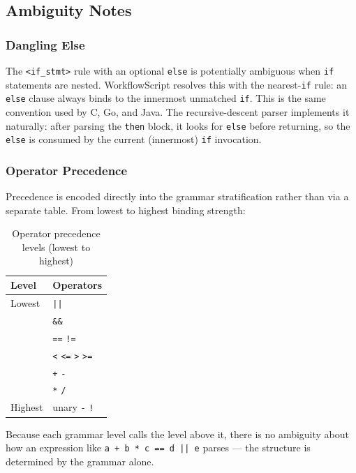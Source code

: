 \documentclass[10pt,a4paper]{article}
\begin{document}
\subsection{Ambiguity Notes}

\subsubsection{Dangling Else}

The \texttt{<if\_stmt>} rule with an optional \texttt{else} is
potentially ambiguous when \texttt{if} statements are nested.
WorkflowScript resolves this with the nearest-\texttt{if} rule: an
\texttt{else} clause always binds to the innermost unmatched \texttt{if}.
This is the same convention used by C, Go, and Java. The
recursive-descent parser implements it naturally: after parsing the
\texttt{then} block, it looks for \texttt{else} before returning, so the
\texttt{else} is consumed by the current (innermost) \texttt{if}
invocation.

\subsubsection{Operator Precedence}

Precedence is encoded directly into the grammar stratification rather
than via a separate table. From lowest to highest binding strength:

\begin{table}[h!]
\centering
\begin{tabular}{@{}ll@{}}
\toprule
\textbf{Level} & \textbf{Operators} \\
\midrule
Lowest  & \texttt{||} \\
        & \texttt{\&\&} \\
        & \texttt{==} \quad \texttt{!=} \\
        & \texttt{<} \quad \texttt{<=} \quad \texttt{>} \quad \texttt{>=} \\
        & \texttt{+} \quad \texttt{-} \\
        & \texttt{*} \quad \texttt{/} \\
Highest & unary \texttt{-} \quad \texttt{!} \\
\bottomrule
\end{tabular}
\caption{Operator precedence levels (lowest to highest)}
\end{table}

Because each grammar level calls the level above it, there is no
ambiguity about how an expression like
\texttt{a + b * c == d || e} parses --- the structure is determined
by the grammar alone.
\end{document}
